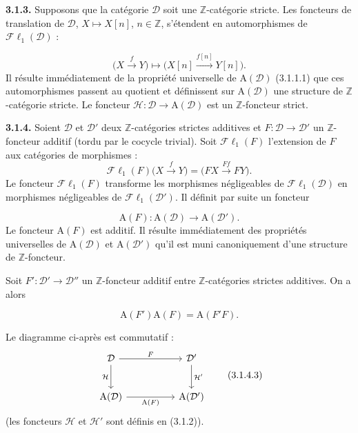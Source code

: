 \clearpage
{}%
\begingroup
\small
\setlength{\parskip}{0pt}%
\setlength{\emergencystretch}{1.5em}%

\noindent\textbf{3.1.3.}\quad
Supposons que la catégorie $\mathcal D$ soit une $\mathbb Z$-catégorie
stricte. Les foncteurs de translation de $\mathcal D$,
$X\longmapsto X[n]$, $n\in\mathbb Z$, s'étendent en automorphismes de
$\mathcal{F}\ell_1(\mathcal D)$ :

\[
\bigl(X\xrightarrow{f}Y\bigr)
\longmapsto
\bigl(X[n]\xrightarrow{f[n]}Y[n]\bigr).
\]
Il résulte immédiatement de la propriété universelle de
$\mathrm A(\mathcal D)$ (3.1.1.1) que ces automorphismes passent au quotient
et définissent sur $\mathrm A(\mathcal D)$ une structure de
$\mathbb Z$-catégorie stricte. Le foncteur
$\mathcal H\colon\mathcal D\to\mathrm A(\mathcal D)$ est un
$\mathbb Z$-foncteur strict.

\medskip
\noindent\textbf{3.1.4.}\quad
Soient $\mathcal D$ et $\mathcal D'$ deux $\mathbb Z$-catégories strictes
additives et $F\colon\mathcal D\to\mathcal D'$ un $\mathbb Z$-foncteur
additif (tordu par le cocycle trivial). Soit $\mathcal{F}\ell_1(F)$
l'extension de $F$ aux catégories de morphismes :
\[
\mathcal{F}\ell_1(F)\bigl(X\xrightarrow{f}Y\bigr)
=\bigl(FX\xrightarrow{Ff}FY\bigr).
\]
Le foncteur $\mathcal{F}\ell_1(F)$ transforme les morphismes négligeables de
$\mathcal{F}\ell_1(\mathcal D)$ en morphismes négligeables de
$\mathcal{F}\ell_1(\mathcal D')$. Il définit par suite un foncteur

\[
\mathrm A(F)\colon\mathrm A(\mathcal D)\longrightarrow\mathrm A(\mathcal D').
\tag{3.1.4.1}
\]
Le foncteur $\mathrm A(F)$ est additif. Il résulte immédiatement des
propriétés universelles de $\mathrm A(\mathcal D)$ et
$\mathrm A(\mathcal D')$ qu'il est muni canoniquement d'une structure de
$\mathbb Z$-foncteur.

Soit $F'\colon\mathcal D'\to\mathcal D''$ un $\mathbb Z$-foncteur additif
entre $\mathbb Z$-catégories strictes additives. On a alors

\[
\mathrm A(F')\mathrm A(F)=\mathrm A(F'F).
\tag{3.1.4.2}
\]

Le diagramme ci-après est commutatif :
\[
\begin{tikzcd}[column sep=5em,row sep=2.5em]
\mathcal D \arrow[r,"F"] \arrow[d,"\mathcal H"'] &
\mathcal D' \arrow[d,"\mathcal H'"] \\
\mathrm A(\mathcal D) \arrow[r,"\mathrm A(F)"'] &
\mathrm A(\mathcal D')
\end{tikzcd}
\tag{3.1.4.3}
\]
(les foncteurs $\mathcal H$ et $\mathcal H'$ sont définis en (3.1.2)).

